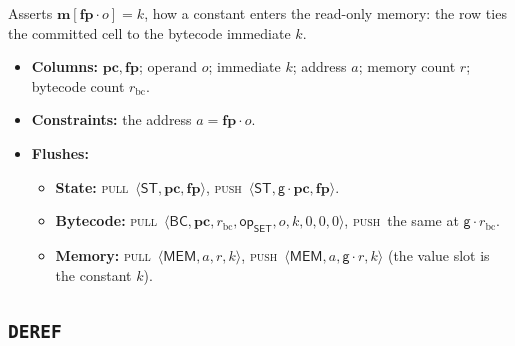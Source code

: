 \documentclass[11pt]{article}
\newcommand{\gen}{\mathsf{g}}
\newcommand{\loc}[1]{\mem[\fp\cdot #1]}
\newcommand{\pc}{\mathbf{pc}}
\newcommand{\fp}{\mathbf{fp}}
\newcommand{\mem}{\mathbf{m}}
\newcommand{\push}{\textsc{push}}
\newcommand{\pull}{\textsc{pull}}
\newcommand{\tup}[1]{\langle #1 \rangle}
\newcommand{\dsep}[1]{\mathsf{#1}}
\newcommand{\opc}[1]{\mathsf{op}_{\mathsf{#1}}}
\begin{document}
Asserts $\loc{o}=k$, how a constant enters the read-only memory: the row ties the committed cell to the bytecode immediate $k$.
\begin{itemize}
\item \textbf{Columns:} $\pc,\fp$; operand $o$; immediate $k$; address $a$; memory count $r$; bytecode count $r_{\mathrm{bc}}$.
\item \textbf{Constraints:} the address $a=\fp\cdot o$.
\item \textbf{Flushes:}
  \begin{itemize}
  \item \textbf{State:} \pull\ $\tup{\dsep{ST},\pc,\fp}$, \push\ $\tup{\dsep{ST},\gen\cdot\pc,\fp}$.
  \item \textbf{Bytecode:} \pull\ $\tup{\dsep{BC},\pc,r_{\mathrm{bc}},\opc{SET},o,k,0,0,0}$, \push\ the same at $\gen\cdot r_{\mathrm{bc}}$.
  \item \textbf{Memory:} \pull\ $\tup{\dsep{MEM},a,r,k}$, \push\ $\tup{\dsep{MEM},a,\gen\cdot r,k}$ (the value slot is the constant $k$).
  \end{itemize}
\end{itemize}

\subsection{\texttt{DEREF}}\label{sec:tab-deref}
\end{document}
